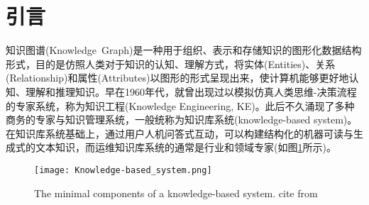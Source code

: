 \section{引言}
知识图谱\textrm{(Knowledge~Graph)}是一种用于组织、表示和存储知识的图形化数据结构形式，目的是仿照人类对于知识的认知、理解方式，将实体\textrm{(Entities)}、关系\textrm{(Relationship)}和属性\textrm{(Attributes)}以图形的形式呈现出来，使计算机能够更好地认知、理解和推理知识。早在1960年代，就曾出现过以模拟仿真人类思维-决策流程的专家系统，称为知识工程\textrm{(Knowledge Engineering, KE)}。此后不久涌现了多种商务的专家与知识管理系统，一般统称为知识库系统\textrm{(knowledge-based system)}。在知识库系统基础上，通过用户人机问答式互动，可以构建结构化的机器可读与生成式的文本知识，而运维知识库系统的通常是行业和领域专家(如图\ref{Fig:Knowledge-based_system}所示)。
\begin{figure}[h!]
\centering
\texttt{[image: Knowledge-based\_system.png]}
\caption{\small\textrm{The minimal components of a knowledge-based system. cite from\cite{ACR56-128_2023}}}%
\label{Fig:Knowledge-based_system}
\end{figure}

